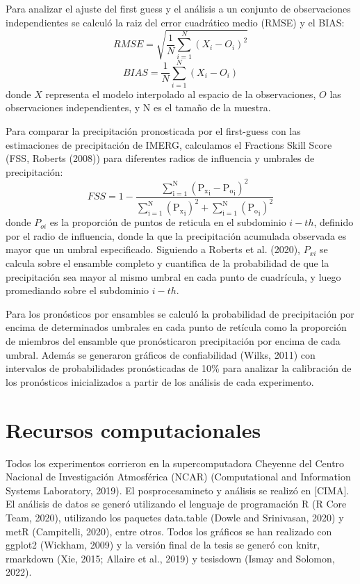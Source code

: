 \documentclass[12pt,oneside]{reedthesis}
\begin{document}
Para analizar el ajuste del first guess y el análisis a un conjunto de observaciones independientes se calculó la raiz del error cuadrático medio (RMSE) y el BIAS:
\begin{equation}
\mathit{RMSE} = \sqrt{\frac{1}{N}\sum_{i = 1}^{N} (X_i - O_i)^{2}}
\label{eq:eq9}
\end{equation}
\begin{equation}
\mathit{BIAS} = \frac{1}{N}\sum_{i = 1}^{N} (X_i - O_i)
\label{eq:eq10}
\end{equation}
donde \(X\) representa el modelo interpolado al espacio de la observaciones, \(O\) las observaciones independientes, y N es el tamaño de la muestra.

Para comparar la precipitación pronosticada por el first-guess con las estimaciones de precipitación de IMERG, calculamos el Fractions Skill Score (FSS, Roberts (2008)) para diferentes radios de influencia y umbrales de precipitación:
\begin{equation}
\mathrm{\mathit{FSS} = 1-\frac{\sum_{i=1}^{N} ({P_x}_i-{P_o}_i)^{2}}{\sum_{i=1}^{N} ({P_x}_i)^{2}+\sum_{i=1}^{N} ({P_o}_i)^{2}}}
\label{eq:eq11}
\end{equation}
donde \(P_{oi}\) es la proporción de puntos de reticula en el subdominio \(i-th\), definido por el radio de influencia, donde la que la precipitación acumulada observada es mayor que un umbral especificado. Siguiendo a Roberts et al. (2020), \(P_{xi}\) se calcula sobre el ensamble completo y cuantifica de la probabilidad de que la precipitación sea mayor al mismo umbral en cada punto de cuadrícula, y luego promediando sobre el subdominio \(i-th\).

Para los pronósticos por ensambles se calculó la probabilidad de precipitación por encima de determinados umbrales en cada punto de retícula como la proporción de miembros del ensamble que pronósticaron precipitación por encima de cada umbral. Además se generaron gráficos de confiabilidad (Wilks, 2011) con intervalos de probabilidades pronósticadas de 10\% para analizar la calibración de los pronósticos inicializados a partir de los análisis de cada experimento.

\hypertarget{recursos-computacionales}{%
\section{Recursos computacionales}\label{recursos-computacionales}}

Todos los experimentos corrieron en la supercomputadora Cheyenne del Centro Nacional de Investigación Atmosférica (NCAR) (Computational and Information Systems Laboratory, 2019). El posprocesamineto y análisis se realizó en {[}CIMA{]}. El análisis de datos se generó utilizando el lenguaje de programación R (R Core Team, 2020), utilizando los paquetes data.table (Dowle and Srinivasan, 2020) y metR (Campitelli, 2020), entre otros.
Todos los gráficos se han realizado con ggplot2 (Wickham, 2009) y la versión final de la tesis se generó con knitr, rmarkdown (Xie, 2015; Allaire et al., 2019) y tesisdown (Ismay and Solomon, 2022).
\end{document}

